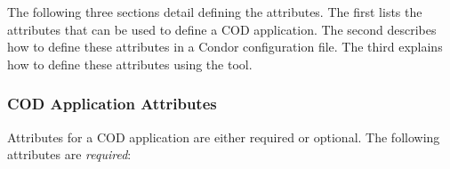The following three sections detail defining the attributes.
The first lists the attributes that can be used to define a COD
application.
The second describes how to define these attributes in a Condor
configuration file.
The third explains how to define these attributes using the  tool.


\subsubsection{\label{sec:cod-application-attributes}
COD Application Attributes}


Attributes for a COD application are either required
or optional.
The following attributes are \emph{required}:

